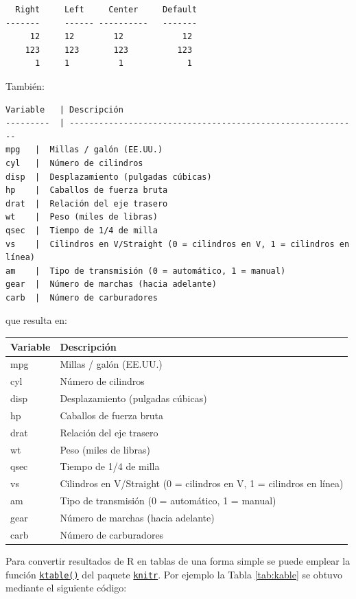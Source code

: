 \documentclass[
]{book}
\theoremstyle{break}
\theoremstyle{nonumberplain}
\begin{document}
\begin{verbatim}
  Right     Left     Center     Default
-------     ------ ----------   -------
     12     12        12            12
    123     123       123          123
      1     1          1             1   
\end{verbatim}

También:

\begin{verbatim}
Variable   | Descripción
---------  | -----------------------------------------------------------
mpg   |  Millas / galón (EE.UU.) 
cyl   |  Número de cilindros
disp  |  Desplazamiento (pulgadas cúbicas)
hp    |  Caballos de fuerza bruta
drat  |  Relación del eje trasero
wt    |  Peso (miles de libras)
qsec  |  Tiempo de 1/4 de milla
vs    |  Cilindros en V/Straight (0 = cilindros en V, 1 = cilindros en línea)
am    |  Tipo de transmisión (0 = automático, 1 = manual)
gear  |  Número de marchas (hacia adelante)
carb  |  Número de carburadores 
\end{verbatim}

que resulta en:

\begin{longtable}[]{@{}ll@{}}
\toprule
Variable & Descripción \\
\midrule
\endhead
mpg & Millas / galón (EE.UU.) \\
cyl & Número de cilindros \\
disp & Desplazamiento (pulgadas cúbicas) \\
hp & Caballos de fuerza bruta \\
drat & Relación del eje trasero \\
wt & Peso (miles de libras) \\
qsec & Tiempo de 1/4 de milla \\
vs & Cilindros en V/Straight (0 = cilindros en V, 1 = cilindros en línea) \\
am & Tipo de transmisión (0 = automático, 1 = manual) \\
gear & Número de marchas (hacia adelante) \\
carb & Número de carburadores \\
\bottomrule
\end{longtable}

Para convertir resultados de R en tablas de una forma simple se puede emplear la función \href{NA}{\texttt{ktable()}} del paquete \href{https://yihui.org/knitr/}{\texttt{knitr}}. Por ejemplo la Tabla \ref{tab:kable} se obtuvo mediante el siguiente código:
\end{document}
